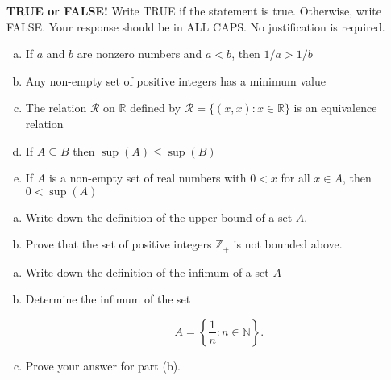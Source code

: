 \documentclass[11pt]{exam}
\theoremstyle{definition}
\begin{document}
\begin{questions}

\addpoints

\question[10]\mbox{}
\textbf{TRUE or FALSE!}  Write  TRUE if the statement is true.  Otherwise, write FALSE.  Your response should be in ALL CAPS.  No justification is required.
\begin{enumerate}[(a)]
\item  
If $a$ and $b$ are nonzero numbers and $a < b$, then $1/a > 1/b$
\vspace{1.2in}
\item
Any non-empty set of positive integers has a minimum value
\vspace{1.2in}
\item
The relation $\mathcal R$ on $\mathbb R$ defined by $\mathcal R = \{(x,x): x\in \mathbb{R}\}$ is an equivalence relation
\vspace{1.2in}
\item
If $A\subseteq B$ then $\sup(A)\leq\sup(B)$
\vspace{1.2in}
\item  
If $A$ is a non-empty set of real numbers with $0 < x$ for all $x\in A$, then $0 < \sup(A)$
\vspace{1.2in}
\end{enumerate}

\newpage
\question[10]\mbox{}

\begin{enumerate}[(a)]
\item
Write down the definition of the upper bound of a set $A$.
\vspace{1in}
\item
Prove that the set of positive integers $\mathbb{Z}_+$ is not bounded above.
\end{enumerate}

\newpage
\question[10]\mbox{}
\begin{enumerate}[(a)]
\item Write down the definition of the infimum of a set $A$
\vspace{1in}

\item Determine the infimum of the set 

$$A = \left\lbrace\frac{1}{n}: n\in\mathbb{N}\right\rbrace.$$
\vspace{1.3in}

\item Prove your answer for part (b).
\end{enumerate}


\end{questions}
\end{document}
